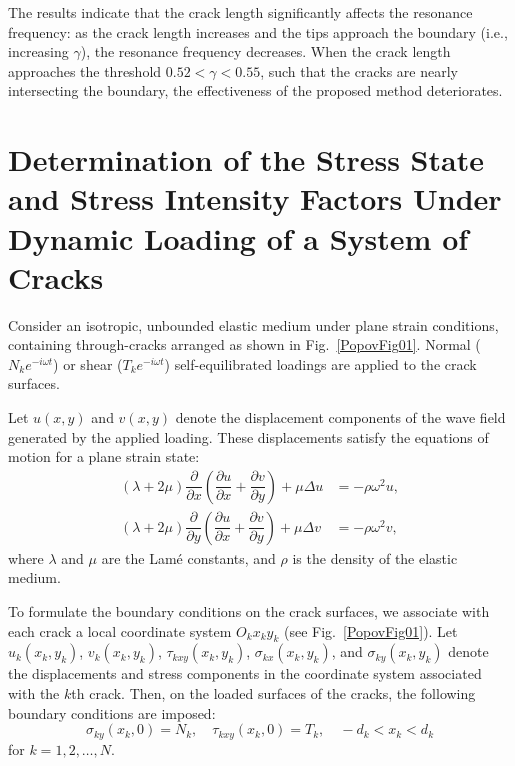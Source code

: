 The results indicate that the crack length significantly affects the resonance frequency: as the crack length increases and the tips approach the boundary (i.e., increasing \( \gamma \)), the resonance frequency decreases. When the crack length approaches the threshold \( 0.52 < \gamma < 0.55 \), such that the cracks are nearly intersecting the boundary, the effectiveness of the proposed method deteriorates.


\section{Determination of the Stress State and Stress Intensity Factors Under Dynamic Loading of a System of Cracks}

Consider an isotropic, unbounded elastic medium under plane strain conditions, containing through-cracks arranged as shown in Fig.~\ref{PopovFig01}. Normal ($N_{k} e^{-i\omega t}$) or shear ($T_{k} e^{-i\omega t}$) self-equilibrated loadings are applied to the crack surfaces.

Let \( u(x,y) \) and \( v(x,y) \) denote the displacement components of the wave field generated by the applied loading. These displacements satisfy the equations of motion for a plane strain state:
\begin{equation} \label{PopovEq842557} 
	\begin{aligned}
		\left(\lambda +2\mu \right)\dfrac{\partial }{\partial x} \left(\dfrac{\partial u}{\partial x} +\dfrac{\partial v}{\partial y} \right)+\mu \Delta u&=-\rho \omega ^{2} u,
		\\[0.5em]
		\left(\lambda +2\mu \right)\dfrac{\partial }{\partial y} \left(\dfrac{\partial u}{\partial x} +\dfrac{\partial v}{\partial y} \right)+\mu \Delta v&=-\rho \omega ^{2} v, 
	\end{aligned}
\end{equation} 
where \( \lambda \) and \( \mu \) are the Lamé constants, and \( \rho \) is the density of the elastic medium.

To formulate the boundary conditions on the crack surfaces, we associate with each crack a local coordinate system \( O_{k}x_{k}y_{k} \) (see Fig.~\ref{PopovFig01}). Let \( u_{k}(x_{k}, y_{k}) \), \( v_{k}(x_{k}, y_{k}) \), \( \tau_{kxy}(x_{k}, y_{k}) \), \( \sigma_{kx}(x_{k}, y_{k}) \), and \( \sigma_{ky}(x_{k}, y_{k}) \) denote the displacements and stress components in the coordinate system associated with the $k$th crack. Then, on the loaded surfaces of the cracks, the following boundary conditions are imposed:
\begin{equation} \label{PopovEq491114} 
	\sigma_{ky}(x_{k}, 0) = N_{k},\quad \tau_{kxy}(x_{k}, 0) = T_{k},\quad -d_{k} < x_{k} < d_{k}
\end{equation} 
for \( k = 1, 2, \dots, N \).

